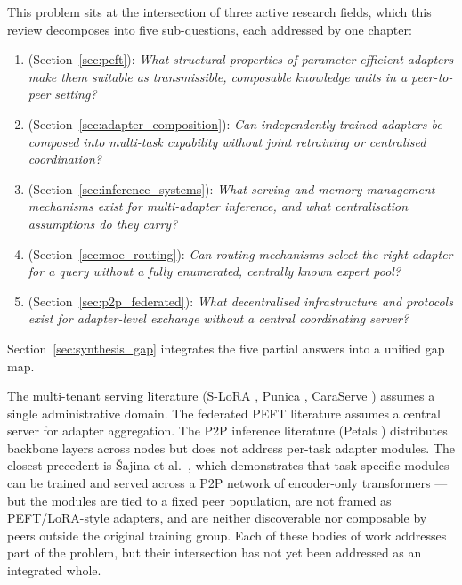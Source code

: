 This problem sits at the intersection of three active research fields, which this
review decomposes into five sub-questions, each addressed by one chapter:
\begin{enumerate}
  \item[\textbf{SQ1}] (Section~\ref{sec:peft}): \textit{What structural properties of
    parameter-efficient adapters make them suitable as transmissible, composable
    knowledge units in a peer-to-peer setting?}
  \item[\textbf{SQ2}] (Section~\ref{sec:adapter_composition}): \textit{Can
    independently trained adapters be composed into multi-task capability without
    joint retraining or centralised coordination?}
  \item[\textbf{SQ3}] (Section~\ref{sec:inference_systems}): \textit{What serving and
    memory-management mechanisms exist for multi-adapter inference, and what
    centralisation assumptions do they carry?}
  \item[\textbf{SQ4}] (Section~\ref{sec:moe_routing}): \textit{Can routing mechanisms
    select the right adapter for a query without a fully enumerated, centrally known
    expert pool?}
  \item[\textbf{SQ5}] (Section~\ref{sec:p2p_federated}): \textit{What decentralised
    infrastructure and protocols exist for adapter-level exchange without a central
    coordinating server?}
\end{enumerate}
Section~\ref{sec:synthesis_gap} integrates the five partial answers into a unified gap
map.

The multi-tenant serving literature (S-LoRA \cite{Sheng2024}, Punica \cite{Chen2023Punica}, 
CaraServe \cite{Li2024CaraServe}) assumes a single administrative domain. 
The federated PEFT literature assumes a central server for adapter aggregation. 
The P2P inference literature (Petals \cite{Borzunov2023}) distributes backbone 
layers across nodes but does not address per-task adapter modules. The closest precedent is 
{\v{S}}ajina et al.~\cite{Sajina2024}, which demonstrates that task-specific modules can be trained and served 
across a P2P network of encoder-only transformers — but the modules are tied to a fixed peer 
population, are not framed as PEFT/LoRA-style adapters, and are neither discoverable nor composable 
by peers outside the original training group. Each of these bodies of work addresses part
of the problem, but their intersection has not yet been addressed as an integrated whole.


